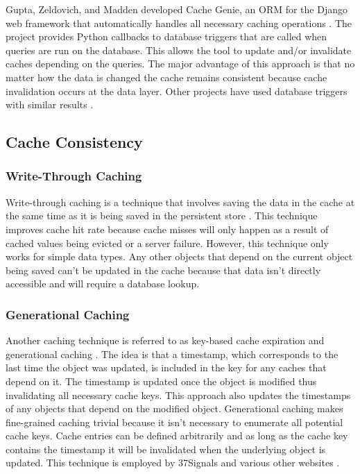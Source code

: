 \documentclass[12pt]{ucthesis}
\begin{document}
Gupta, Zeldovich, and Madden developed Cache Genie, an ORM for the Django web framework that automatically handles all necessary caching operations \cite{triggerBasedORM}.
The project provides Python callbacks to database triggers that are called when queries are run on the database.
This allows the tool to update and/or invalidate caches depending on the queries.
The major advantage of this approach is that no matter how the data is changed the cache remains consistent because cache invalidation occurs at the data layer.
Other projects have used database triggers with similar results \cite{scalableConsistentCaching}.

\subsection{Cache Consistency}
\subsubsection{Write-Through Caching}
Write-through caching is a technique that involves saving the data in the cache at the same time as it is being saved in the persistent store \cite{writeThroughCaching}.
This technique improves cache hit rate because cache misses will only happen as a result of cached values being evicted or a server failure.
However, this technique only works for simple data types.
Any other objects that depend on the current object being saved can't be updated in the cache because that data isn't directly accessible and will require a database lookup.

\subsubsection{Generational Caching}
Another caching technique is referred to as key-based cache expiration \cite{keyBasedCacheExpiration} and generational caching \cite{generationalCaching}.
The idea is that a timestamp, which corresponds to the last time the object was updated, is included in the key for any caches that depend on it.
The timestamp is updated once the object is modified thus invalidating all necessary cache keys.
This approach also updates the timestamps of any objects that depend on the modified object.
Generational caching makes fine-grained caching trivial because it isn't necessary to enumerate all potential cache keys.
Cache entries can be defined arbitrarily and as long as the cache key contains the timestamp it will be invalidated when the underlying object is updated.
This technique is employed by 37Signals and various other websites \cite{keyBasedCacheExpiration}.
\end{document}
